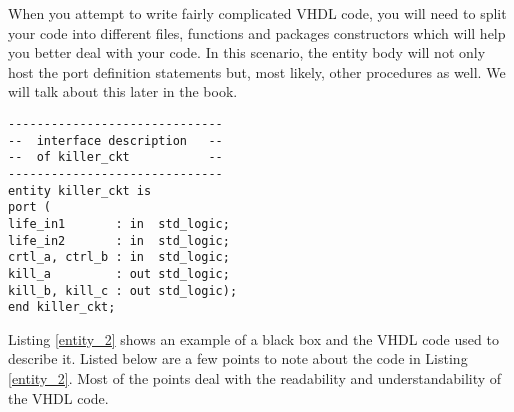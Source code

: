 When you attempt to write fairly complicated VHDL code, you will need to split your code into different files, functions and packages constructors which will help you better deal with your code. In this scenario, the entity body will not only host the port definition statements but, most likely, other procedures as well. We will talk about this later in the book.\\
\begin{minipage}{0.51\linewidth}
\vspace{5pt}
\begin{lstlisting}[label=entity_2, caption=VHDL entity declaration.]
------------------------------
--  interface description   --
--  of killer_ckt           --
------------------------------
entity killer_ckt is
port (
life_in1       : in  std_logic;
life_in2       : in  std_logic;
crtl_a, ctrl_b : in  std_logic;
kill_a         : out std_logic;
kill_b, kill_c : out std_logic);
end killer_ckt;
\end{lstlisting}
\end{minipage}
\begin{minipage}{0.49\linewidth}
\begin{flushright}
\end{flushright}
\end{minipage}

Listing \ref{entity_2} shows an example of a black box and the VHDL code used to describe it. Listed below are a few points to note about the code in Listing \ref{entity_2}. Most of the points deal with the readability and understandability of the VHDL code.

